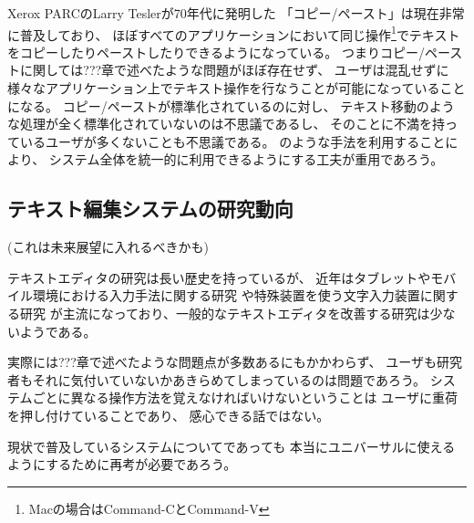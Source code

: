 Xerox PARCのLarry Teslerが70年代に発明した\cite{Tesler:CopyPaste}
「コピー/ペースト」は現在非常に普及しており、
ほぼすべてのアプリケーションにおいて同じ操作\footnote{
  Macの場合はCommand-CとCommand-V
}でテキストをコピーしたりペーストしたりできるようになっている。
つまりコピー/ペーストに関しては???章で述べたような問題がほぼ存在せず、
ユーザは混乱せずに様々なアプリケーション上でテキスト操作を行なうことが可能になっていることになる。
コピー/ペーストが標準化されているのに対し、
テキスト移動のような処理が全く標準化されていないのは不思議であるし、
そのことに不満を持っているユーザが多くないことも不思議である。
{\system}のような手法を利用することにより、
システム全体を統一的に利用できるようにする工夫が重用であろう。

\subsection{テキスト編集システムの研究動向}

(これは未来展望に入れるべきかも)

テキストエディタの研究は長い歴史を持っているが\cite{texteditors.org}、
近年はタブレットやモバイル環境における入力手法に関する研究%
\cite{Li:1lineKB}%
\cite{MacKenzie:H4Writer}%
\cite{Rick:VirtualKB}%
や特殊装置を使う文字入力装置に関する研究%
\cite{Dietz:PressureKB}%
\cite{Harrison:Skinput}%
\cite{Murase:CameraKB}%
\cite{Wigdor:TiltKB}
が主流になっており、一般的なテキストエディタを改善する研究は少ないようである。

実際には???章で述べたような問題点が多数あるにもかかわらず、
ユーザも研究者もそれに気付いていないかあきらめてしまっているのは問題であろう。
システムごとに異なる操作方法を覚えなければいけないということは
ユーザに重荷を押し付けていることであり、
感心できる話ではない。

現状で普及しているシステムについてであっても
本当にユニバーサルに使えるようにするために再考が必要であろう。

